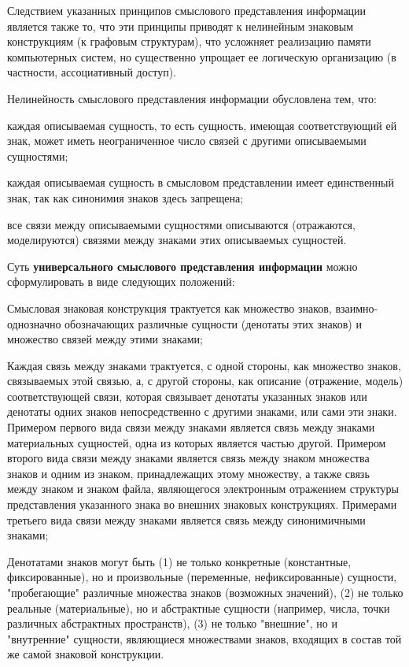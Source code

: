 Следствием указанных принципов смыслового представления информации  является также то, что эти принципы приводят к нелинейным знаковым конструкциям (к графовым структурам), что усложняет реализацию памяти компьютерных систем, но существенно упрощает ее логическую организацию (в частности, ассоциативный доступ).

Нелинейность смыслового представления информации обусловлена тем, что: 
\begin{textitemize}
	\item каждая описываемая сущность, то есть сущность, имеющая соответствующий ей знак, может иметь неограниченное число связей с другими описываемыми сущностями;
	\item каждая описываемая сущность в смысловом представлении имеет единственный знак, так как синонимия знаков здесь запрещена;
	\item все связи между описываемыми сущностями описываются (отражаются, моделируются) связями между знаками этих описываемых сущностей.
\end{textitemize}

Суть \textbf{универсального смыслового представления информации} можно сформулировать в виде следующих положений:
\begin{textitemize}
	\item Смысловая знаковая конструкция трактуется как множество знаков, взаимно-однозначно обозначающих различные сущности (денотаты этих знаков) и множество связей между этими знаками;
	\item Каждая связь между знаками трактуется, с одной стороны, как множество знаков, связываемых этой связью, а, с другой стороны, как описание (отражение, модель) соответствующей связи, которая связывает денотаты указанных знаков или денотаты одних знаков непосредственно с другими знаками, или сами эти знаки. Примером первого вида связи между знаками является связь между знаками материальных сущностей, одна из которых является частью другой. Примером второго вида связи между знаками является связь между знаком множества знаков и одним из знаком, принадлежащих этому множеству, а также связь между знаком и знаком файла, являющегося электронным отражением структуры представления указанного знака во внешних знаковых конструкциях. Примерами третьего вида связи между знаками является связь между синонимичными знаками;
	\item Денотатами знаков могут быть (1) не только конкретные (константные, фиксированные), но и произвольные (переменные, нефиксированные) сущности, "пробегающие"{} различные множества знаков (возможных значений), 
	(2) не только реальные (материальные), но и абстрактные сущности (например, числа, точки различных абстрактных пространств), 
	(3) не только "внешние"{}, но и "внутренние"{} сущности, являющиеся множествами знаков, входящих в состав той же самой знаковой конструкции.
\end{textitemize}

